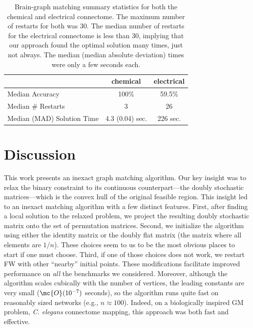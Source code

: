 \documentclass[10pt,journal,cspaper,compsoc]{IEEEtran}
\begin{document}
\begin{table}
\caption{Brain-graph matching summary statistics for both the chemical and electrical connectome.  The maximum number of restarts for both was 30.  The median number of restarts for the electrical connectome is less than 30, implying that our approach found the optimal solution many times, just not always.  The median (median absolute deviation) times were only a few seconds each.}
	\label{tab:1}
\begin{center}
\begin{tabular}{|l|c|c|}
\hline	 					& chemical 		& electrical  \\ \hline
	Median Accuracy    &       100\%            &             59.5\% \\
	Median \# Restarts  &         3            &                   26 \\
	Median (MAD) Solution Time     &  4.3 (0.04) sec.      &    226 sec. \\ \hline
\end{tabular} 
\end{center}
\end{table}

 


\section{Discussion}

This work presents an inexact graph matching algorithm.  Our key insight was to relax the binary constraint to its continuous counterpart---the doubly stochastic matrices---which is the convex hull of the original feasible region.  This insight led to an inexact matching algorithm with a few distinct features. %
First, after finding a local solution to the relaxed problem, we project the resulting doubly stochastic matrix onto the set of permutation matrices.  Second, we initialize the algorithm using either the identity matrix or the doubly flat matrix (the matrix where all elements are $1/n$).  These choices seem to us to be the most obvious places to start if one must choose.  Third, if one of those choices does not work, we restart FW with other ``nearby'' initial points.  These modifications facilitate improved performance on \emph{all} the benchmarks we considered.  Moreover, although the algorithm scales cubically with the number of vertices, the leading constants are very small ($\mc{O}(10^{-7})$ seconds), so the algorithm runs quite fast on reasonably sized networks (e.g., $n \approx 100$).  Indeed, on a biologically inspired GM problem, \emph{C. elegans} connectome mapping, this approach was both fast and effective.  
\end{document}
